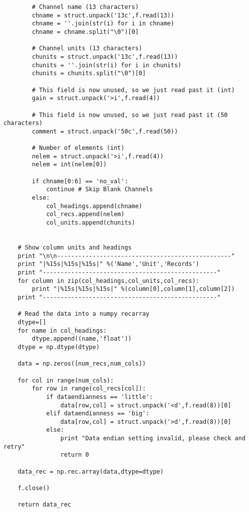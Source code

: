 \documentclass[a4paper,11pt,oneside]{article}
\begin{document}
\begin{lstlisting}
        # Channel name (13 characters)
        chname = struct.unpack('13c',f.read(13))
        chname = ''.join(str(i) for i in chname)
        chname = chname.split("\0")[0] 
        
        # Channel units (13 characters)
        chunits = struct.unpack('13c',f.read(13))
        chunits = ''.join(str(i) for i in chunits)
        chunits = chunits.split("\0")[0]
    
        # This field is now unused, so we just read past it (int)
        gain = struct.unpack('>i',f.read(4))
        
        # This field is now unused, so we just read past it (50 characters)
        comment = struct.unpack('50c',f.read(50))

        # Number of elements (int)
        nelem = struct.unpack('>i',f.read(4))
        nelem = int(nelem[0])
        
        if chname[0:6] == 'no_val':
            continue # Skip Blank Channels
        else:
            col_headings.append(chname)
            col_recs.append(nelem)
            col_units.append(chunits)
    
    
    # Show column units and headings
    print "\n\n-------------------------------------------------"
    print "|%15s|%15s|%15s|" %('Name','Unit','Records')
    print "-------------------------------------------------"
    for column in zip(col_headings,col_units,col_recs):
        print "|%15s|%15s|%15s|" %(column[0],column[1],column[2])
    print "-------------------------------------------------"
    
    # Read the data into a numpy recarray
    dtype=[]
    for name in col_headings:
        dtype.append((name,'float'))
    dtype = np.dtype(dtype)
    
    data = np.zeros([num_recs,num_cols])
    
    for col in range(num_cols):
        for row in range(col_recs[col]):
            if dataendianness == 'little':
                data[row,col] = struct.unpack('<d',f.read(8))[0]
            elif dataendianness == 'big':
                data[row,col] = struct.unpack('>d',f.read(8))[0]
            else:
                print "Data endian setting invalid, please check and retry"
                return 0

    data_rec = np.rec.array(data,dtype=dtype)
    
    f.close()
    
    return data_rec

\end{lstlisting}
\end{document}
